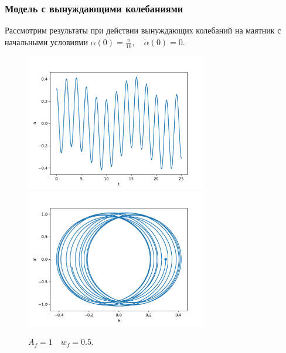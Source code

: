         \subsubsection{Модель с вынуждающими колебаниями}
            Рассмотрим результаты при действии вынуждающих колебаний на маятник с начальными условиями $\alpha(0) = \frac{\pi}{10}, \quad \dot{\alpha}(0) = 0$.
            \begin{figure}[H]
                \centering
                \includegraphics[width=8cm]{pictures/4resonance1.pdf}
                \includegraphics[width=8cm]{pictures/4resonance1p.pdf}
                \caption{$A_f = 1 \quad w_f = 0.5$.}
            \end{figure}

